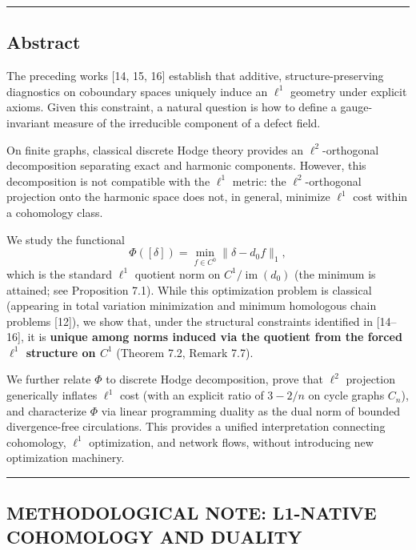 \documentclass[
]{article}
\begin{document}
\begin{center}\rule{0.5\linewidth}{0.5pt}\end{center}

\subsection{Abstract}\label{abstract}

The preceding works {[}14, 15, 16{]} establish that additive,
structure-preserving diagnostics on coboundary spaces uniquely induce an
\(\ell^1\) geometry under explicit axioms. Given this constraint, a
natural question is how to define a gauge-invariant measure of the
irreducible component of a defect field.

On finite graphs, classical discrete Hodge theory provides an
\(\ell^2\)-orthogonal decomposition separating exact and harmonic
components. However, this decomposition is not compatible with the
\(\ell^1\) metric: the \(\ell^2\)-orthogonal projection onto the
harmonic space does not, in general, minimize \(\ell^1\) cost within a
cohomology class.

We study the functional \[
\Phi([\delta]) = \min_{f \in C^0} \|\delta - d_0 f\|_1,
\] which is the standard \(\ell^1\) quotient norm on
\(C^1 / \operatorname{im}(d_0)\) (the minimum is attained; see
Proposition 7.1). While this optimization problem is classical
(appearing in total variation minimization and minimum homologous chain
problems {[}12{]}), we show that, under the structural constraints
identified in {[}14--16{]}, it is \textbf{unique among norms induced via
the quotient from the forced \(\ell^1\) structure on \(C^1\)} (Theorem
7.2, Remark 7.7).

We further relate \(\Phi\) to discrete Hodge decomposition, prove that
\(\ell^2\) projection generically inflates \(\ell^1\) cost (with an
explicit ratio of \(3 - 2/n\) on cycle graphs \(C_n\)), and characterize
\(\Phi\) via linear programming duality as the dual norm of bounded
divergence-free circulations. This provides a unified interpretation
connecting cohomology, \(\ell^1\) optimization, and network flows,
without introducing new optimization machinery.

\begin{center}\rule{0.5\linewidth}{0.5pt}\end{center}

\subsection{METHODOLOGICAL NOTE: L1-NATIVE COHOMOLOGY AND
DUALITY}\label{methodological-note-l1-native-cohomology-and-duality}
\end{document}
